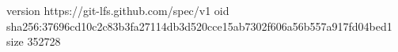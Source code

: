 version https://git-lfs.github.com/spec/v1
oid sha256:37696cd10c2c83b3fa27114db3d520cce15ab7302f606a56b557a917fd04bed1
size 352728

